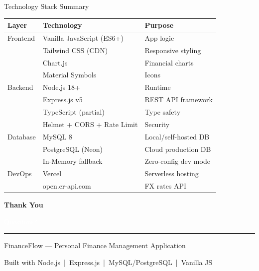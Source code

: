 \documentclass[aspectratio=169, 12pt]{beamer}
\begin{document}
\begin{frame}{Technology Stack Summary}

\begin{center}
\footnotesize
\renewcommand{\arraystretch}{0.95}
\begin{tabular}{@{}l l l@{}}
\toprule
\textbf{Layer} & \textbf{Technology} & \textbf{Purpose} \\
\midrule
\textcolor{primary}{Frontend} & Vanilla JavaScript (ES6+) & App logic \\
& Tailwind CSS (CDN) & Responsive styling \\
& Chart.js & Financial charts \\
& Material Symbols & Icons \\
\midrule
\textcolor{primary}{Backend} & Node.js 18+ & Runtime \\
& Express.js v5 & REST API framework \\
& TypeScript (partial) & Type safety \\
& Helmet + CORS + Rate Limit & Security \\
\midrule
\textcolor{primary}{Database} & MySQL 8 & Local/self-hosted DB \\
& PostgreSQL (Neon) & Cloud production DB \\
& In-Memory fallback & Zero-config dev mode \\
\midrule
\textcolor{primary}{DevOps} & Vercel & Serverless hosting \\
& open.er-api.com & FX rates API \\
\bottomrule
\end{tabular}
\renewcommand{\arraystretch}{1.0}
\end{center}
\end{frame}

{
\begin{frame}[plain]
\begin{center}
\vspace{2cm}
{\Huge\bfseries\textcolor{primary}{Thank You}}\par
\vspace{12pt}
{\large\textcolor{white}{Questions?}}\par
\vspace{1.5cm}
\textcolor{primary}{\rule{0.3\textwidth}{2pt}}\par
\vspace{1.5cm}
{\normalsize\textcolor{gray!50}{FinanceFlow --- Personal Finance Management Application}}\par
\vspace{8pt}
{\small\textcolor{gray!60}{Built with Node.js \,|\, Express.js \,|\, MySQL/PostgreSQL \,|\, Vanilla JS}}\par
\end{center}
\end{frame}
}

\end{document}
